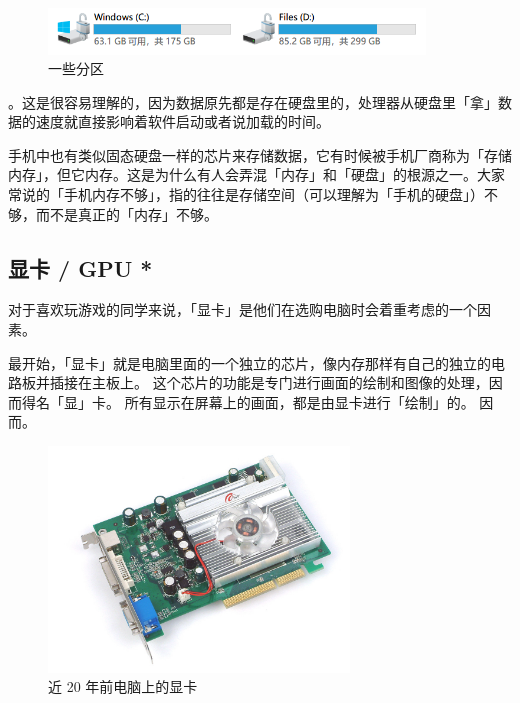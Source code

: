 \begin{figure}[H]
  \centering
  \includegraphics[width=10cm]{assets/Partition.png}
  \caption{一些分区}
  \label{partitions}
\end{figure}


。这是很容易理解的，因为数据原先都是存在硬盘里的，处理器从硬盘里「拿」数据的速度就直接影响着软件启动或者说加载的时间。

\begin{note}
  手机中也有类似固态硬盘一样的芯片来存储数据，它有时候被手机厂商称为「存储内存」，但它内存。这是为什么有人会弄混「内存」和「硬盘」的根源之一。大家常说的「手机内存不够」，指的往往是存储空间（可以理解为「手机的硬盘」）不够，而不是真正的「内存」不够。
\end{note}

\subsection{显卡 / GPU *}

对于喜欢玩游戏的同学来说，「显卡」是他们在选购电脑时会着重考虑的一个因素。

最开始，「显卡」就是电脑里面的一个独立的芯片，像内存那样有自己的独立的电路板并插接在主板上。
这个芯片的功能是专门进行画面的绘制和图像的处理，因而得名「显」卡。
所有显示在屏幕上的画面，都是由显卡进行「绘制」的。
因而。

\begin{figure}[H]
  \centering
  \includegraphics[width=8cm]{assets/Old_GPU.png}
  \caption{近 20 年前电脑上的显卡}
  \label{old-gpu}
\end{figure}

